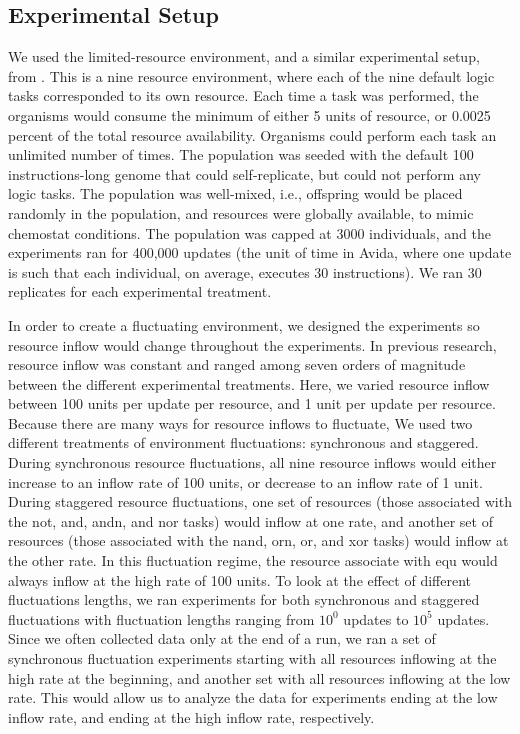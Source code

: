 \documentclass[10pt]{article}
\begin{document}
\subsection{Experimental Setup}

We used the limited-resource environment, and a similar experimental setup, from \cite{chow2004adaptive}.
This is a nine resource environment, where each of the nine default logic tasks corresponded to its own resource.
Each time a task was performed, the organisms would consume the minimum of either 5 units of resource, or 0.0025 percent of the total resource availability.
Organisms could perform each task an unlimited number of times.
The population was seeded with the default 100 instructions-long genome that could self-replicate, but could not perform any logic tasks.
The population was well-mixed, i.e., offspring would be placed randomly in the population, and resources were globally available, to mimic chemostat conditions.
The population was capped at 3000 individuals, and the experiments ran for 400,000 updates (the unit of time in Avida, where one update is such that each individual, on average, executes 30 instructions).
We ran 30 replicates for each experimental treatment.

In order to create a fluctuating environment, we designed the experiments so resource inflow would change throughout the experiments. In previous research, resource inflow was constant and ranged among seven orders of magnitude between the different experimental treatments. Here, we varied resource inflow between 100 units per update per resource, and 1 unit per update per resource. Because there are many ways for resource inflows to fluctuate, We used two different treatments of environment fluctuations: synchronous and staggered. During synchronous resource fluctuations, all nine resource inflows would either increase to an inflow rate of 100 units, or decrease to an inflow rate of 1 unit. During staggered resource fluctuations, one set of resources (those associated with the not, and, andn, and nor tasks) would inflow at one rate, and another set of resources (those associated with the nand, orn, or, and xor tasks) would inflow at the other rate. In this fluctuation regime, the resource associate with equ would always inflow at the high rate of 100 units. To look at the effect of different fluctuations lengths, we ran experiments for both synchronous and staggered fluctuations with fluctuation lengths ranging from $10^0$ updates to $10^5$ updates. Since we often collected data only at the end of a run, we ran a set of synchronous fluctuation experiments starting with all resources inflowing at the high rate at the beginning, and another set with all resources inflowing at the low rate. This would allow us to analyze the data for experiments ending at the low inflow rate, and ending at the high inflow rate, respectively.
\end{document}
